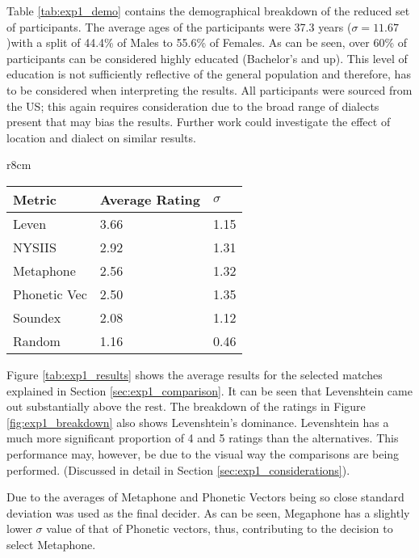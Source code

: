 Table \ref{tab:exp1_demo} contains the demographical breakdown of the reduced set of participants. The average ages of the participants were 37.3 years ($\sigma = 11.67$)with a split of 44.4\% of Males to 55.6\% of Females. As can be seen, over 60\% of participants can be considered highly educated (Bachelor’s and up). This level of education is not sufficiently reflective of the general population and therefore, has to be considered when interpreting the results. All participants were sourced from the US; this again requires consideration due to the broad range of dialects present that may bias the results. Further work could investigate the effect of location and dialect on similar results. 

\begin{wraptable}[11]{r}{8cm}
    \centering
    \begin{tabular}{|l|l|l|}
        \hline
        \textbf{Metric} & \textbf{Average Rating}  & \textbf{$\sigma$}\\
        \hline
        Leven     & 3.66  & 1.15\\
        NYSIIS    & 2.92 & 1.31\\
        Metaphone & 2.56 & 1.32\\
        Phonetic Vec & 2.50 & 1.35\\
        Soundex & 2.08 & 1.12 \\
        \hline
        Random  & 1.16 & 0.46\\
        \hline
    \end{tabular}
    \caption{Average metric performance}
    \label{tab:exp1_results}
\end{wraptable}


Figure \ref{tab:exp1_results} shows the average results for the selected matches explained in Section \ref{sec:exp1_comparison}. It can be seen that Levenshtein came out substantially above the rest. The breakdown of the ratings in Figure \ref{fig:exp1_breakdown} also shows Levenshtein's dominance. Levenshtein has a much more significant proportion of 4 and 5 ratings than the alternatives. This performance may, however, be due to the visual way the comparisons are being performed. (Discussed in detail in Section \ref{sec:exp1_considerations}). 

Due to the averages of Metaphone and Phonetic Vectors being so close standard deviation was used as the final decider. As can be seen, Megaphone has a slightly lower $\sigma$ value of that of Phonetic vectors, thus, contributing to the decision to select Metaphone.

